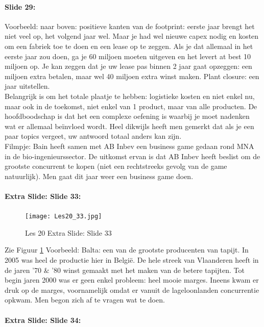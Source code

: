 \documentclass[10pt,a4paper]{report}
\begin{document}
\paragraph{Slide 29:} Voorbeeld: naar boven: positieve kanten van de footprint: eerste jaar brengt het niet veel op, het volgend jaar wel. Maar je had wel nieuwe capex nodig en kosten om een fabriek toe te doen en een lease op te zeggen. Als je dat allemaal in het eerste jaar zou doen, ga je 60 miljoen moeten uitgeven en het levert at best 10 miljoen op. Je kan zeggen dat je uw lease pas binnen 2 jaar gaat opzeggen: een miljoen extra betalen, maar wel 40 miljoen extra winst maken. Plant closure: een jaar uitstellen.\\
Belangrijk is om het totale plaatje te hebben: logistieke kosten en niet enkel nu, maar ook in de toekomst, niet enkel van 1 product, maar van alle producten. De hoofdboodschap is dat het een complexe oefening is waarbij je moet nadenken wat er allemaal be\"invloed wordt. Heel dikwijls heeft men gemerkt dat als je een paar topics vergeet, uw antwoord totaal anders kan zijn. \\
Filmpje: Bain heeft samen met AB Inbev een business game gedaan rond MNA in de bio-ingenieurssector. De uitkomst ervan is dat AB Inbev heeft beslist om de grootste concurrent te kopen (niet een rechtstreeks gevolg van de game natuurlijk). Men gaat dit jaar weer een business game doen. 

\paragraph{Extra Slide: Slide 33:} 

\begin{figure}[h!]
\centering
\texttt{[image: Les20\_33.jpg]}
\caption{Les 20 Extra Slide: Slide 33} 
\label{les20_33}
\end{figure}

Zie Figuur \ref{les20_33} Voorbeeld: Balta: een van de grootste producenten van tapijt. In 2005 was heel de productie hier in Belgi\"e. De hele streek van Vlaanderen heeft in de jaren '70 $\&$ '80 winst gemaakt met het maken van de betere tapijten. Tot begin jaren 2000 was er geen enkel probleem: heel mooie marges. Ineens kwam er druk op de marges, voornamelijk omdat er vanuit de lageloonlanden concurrentie opkwam. Men begon zich af te vragen wat te doen.

\paragraph{Extra Slide: Slide 34:} 
\end{document}
